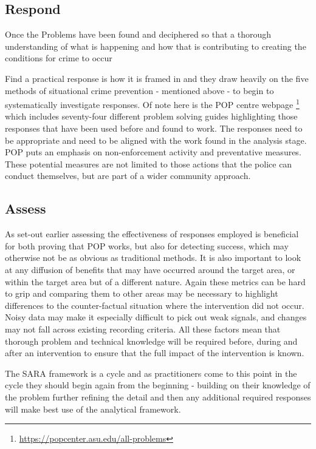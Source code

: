 \subsection{Respond} Once the Problems have been found and deciphered so that a thorough understanding of what is happening and how that is contributing to creating the conditions for crime to occur


Find a practical response is how it is framed in   and they draw heavily on the five methods of situational crime prevention - mentioned  above - to begin to systematically investigate responses.  Of note here is the POP centre webpage \footnote{ \url{https://popcenter.asu.edu/all-problems} } which includes seventy-four different problem solving guides highlighting those responses that have been used before and found to work. The responses need to be appropriate and need to be aligned with the work found in the analysis stage. POP puts an emphasis on non-enforcement activity and preventative measures. These potential measures are not limited to those actions that the police can conduct themselves, but are part of a wider community approach.  


\subsection{Assess} As set-out earlier assessing the effectiveness of responses employed is beneficial for both proving that POP works, but also for detecting success, which may otherwise not be as obvious as traditional methods. It is also important to look at any diffusion of benefits that may have occurred around the target area, or within the target area but of a different nature. Again these metrics can be hard to grip and comparing them to other areas may be necessary to highlight differences to the counter-factual situation where the intervention did not occur. Noisy data may make it especially difficult to pick out weak signals, and changes may not fall across existing recording criteria.  All these factors mean that thorough problem and technical knowledge will be required before, during and after an intervention to ensure that the full impact of the intervention is known. 

The SARA framework is a cycle and as practitioners come to this point in the cycle they should begin again from the beginning - building on their knowledge of the problem further refining the detail and then any additional required responses will make best use of the analytical framework.

